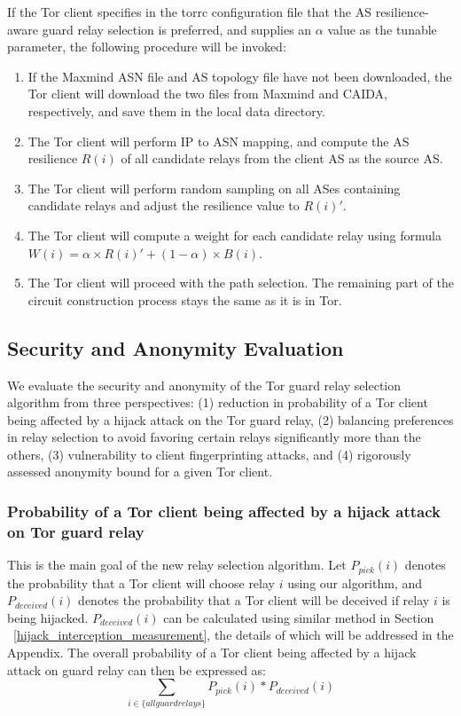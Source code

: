 If the Tor client specifies in the torrc configuration file that the AS resilience-aware guard relay selection is preferred, and supplies an $\alpha$ value as the tunable parameter, the following procedure will be invoked:

\begin{enumerate}
\item If the Maxmind ASN file and AS topology file have not been downloaded, the Tor client will download the two files from Maxmind and CAIDA, respectively, and save them in the local data directory. 
\item The Tor client will perform IP to ASN mapping, and compute the AS resilience $R(i)$ of all candidate relays from the client AS as the source AS. 
\item The Tor client will perform random sampling on all ASes containing candidate relays and adjust the resilience value to $R(i)\prime$.
\item The Tor client will compute a weight for each candidate relay using formula $W(i) = \alpha \times R(i) \prime + (1 - \alpha) \times B(i)$. 
\item The Tor client will proceed with the path selection. The remaining part of the circuit construction process stays the same as it is in Tor. 
\end{enumerate}

\subsection{Security and Anonymity Evaluation}
We evaluate the security and anonymity of the Tor guard relay selection algorithm from three perspectives: (1) reduction in probability of a Tor client being affected by a hijack attack on the Tor guard relay, (2) balancing preferences in relay selection to avoid favoring certain relays significantly more than the others, (3) vulnerability to client fingerprinting attacks, and (4) rigorously assessed anonymity bound for a given Tor client. 

\subsubsection{Probability of a Tor client being affected by a hijack attack on Tor guard relay}
\label{attack_probability}
This is the main goal of the new relay selection algorithm. Let $P_{pick}(i)$ denotes the probability that a Tor client will choose relay $i$ using our algorithm, and $P_{deceived}(i)$ denotes the probability that a Tor client will be deceived if relay $i$ is being hijacked. $P_{deceived}(i)$ can be calculated using similar method in Section ~\ref{hijack_interception_measurement}, the details of which will be addressed in the Appendix.  The overall probability of a Tor client being affected by a hijack attack on guard relay can then be expressed as:
\begin{equation*}
\sum_{i \in \{all guard relays\}} P_{pick}(i) * P_{deceived}(i)
\end{equation*}

